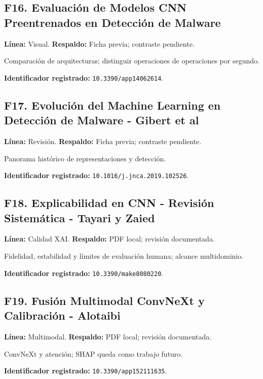 \begin{samepage}
\subsection*{F16. Evaluación de Modelos CNN Preentrenados en Detección de Malware}
\noindent\textbf{Línea:} Visual. \textbf{Respaldo:} Ficha previa; contraste pendiente. 

Comparación de arquitecturas; distinguir operaciones de operaciones por segundo.

\noindent\textbf{Identificador registrado:} \nolinkurl{10.3390/app14062614}.

\end{samepage}
\begin{samepage}
\subsection*{F17. Evolución del Machine Learning en Detección de Malware - Gibert et al}
\noindent\textbf{Línea:} Revisión. \textbf{Respaldo:} Ficha previa; contraste pendiente. 

Panorama histórico de representaciones y detección.

\noindent\textbf{Identificador registrado:} \nolinkurl{10.1016/j.jnca.2019.102526}.

\end{samepage}
\begin{samepage}
\subsection*{F18. Explicabilidad en CNN - Revisión Sistemática - Tayari y Zaied}
\noindent\textbf{Línea:} Calidad XAI. \textbf{Respaldo:} PDF local; revisión documentada. \parencite{Tayari2026Clarity}

Fidelidad, estabilidad y límites de evaluación humana; alcance multidominio.

\noindent\textbf{Identificador registrado:} \nolinkurl{10.3390/make8080220}.

\end{samepage}
\begin{samepage}
\subsection*{F19. Fusión Multimodal ConvNeXt y Calibración - Alotaibi}
\noindent\textbf{Línea:} Multimodal. \textbf{Respaldo:} PDF local; revisión documentada. \parencite{Alotaibi2025Multimodal}

ConvNeXt y atención; SHAP queda como trabajo futuro.

\noindent\textbf{Identificador registrado:} \nolinkurl{10.3390/app152111635}.

\end{samepage}
